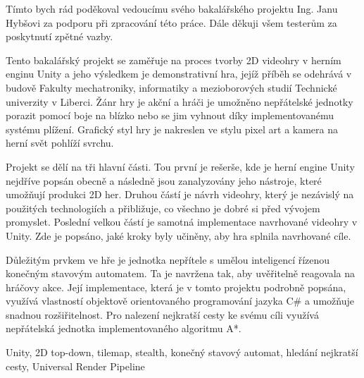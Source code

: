 \documentclass[FM,Proj,bw]{tulthesis}
\begin{document}
	
	\begin{acknowledgement}
		Tímto bych rád poděkoval vedoucímu svého bakalářského projektu Ing. Janu Hybšovi za podporu při zpracování této práce. Dále děkuji všem testerům za poskytnutí zpětné vazby.
	\end{acknowledgement}
	
	\begin{abstractCZ}
		Tento bakalářský projekt se zaměřuje na proces tvorby 2D videohry v herním enginu Unity a jeho výsledkem je demonstrativní hra, jejíž příběh se odehrává v budově Fakulty mechatroniky, informatiky a mezioborových studií Technické univerzity v Liberci. Žánr hry je akční a hráči je umožněno nepřátelské jednotky porazit pomocí boje na blízko nebo se jim vyhnout díky implementovanému systému plížení. Grafický styl hry je nakreslen ve stylu pixel art a kamera na herní svět pohlíží svrchu.
		
		Projekt se dělí na tři hlavní části. Tou první je rešerše, kde je herní engine Unity nejdříve popsán obecně a následně jsou zanalyzovány jeho nástroje, které umožňují produkci 2D her. Druhou částí je návrh videohry, který je nezávislý na použitých technologiích a přibližuje, co všechno je dobré si před vývojem promyslet. Poslední velkou částí je samotná implementace navrhované videohry v Unity. Zde je popsáno, jaké kroky byly učiněny, aby hra splnila navrhované cíle.
		
		Důležitým prvkem ve hře je jednotka nepřítele s umělou inteligencí řízenou konečným stavovým automatem. Ta je navržena tak, aby uvěřitelně reagovala na hráčovy akce. Její implementace, která je v tomto projektu podrobně popsána, využívá vlastností objektově orientovaného programování jazyka C\# a umožňuje snadnou rozšiřitelnost. Pro nalezení nejkratší cesty ke svému cíli využívá nepřátelská jednotka implementovaného algoritmu A*.
	\end{abstractCZ}
	
	\begin{keywordsCZ}
		Unity, 2D top-down, tilemap, stealth, konečný stavový automat, hledání nejkratší cesty, Universal Render Pipeline
	\end{keywordsCZ}
	\vspace{2cm}
	
\end{document}
